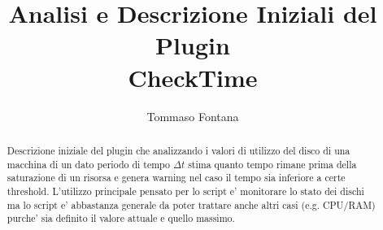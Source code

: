 \documentclass{article}
\title{Analisi e Descrizione Iniziali del Plugin \\ \textbf{CheckTime \version}}
\author{Tommaso Fontana}
\begin{document}
\maketitle

\begin{abstract}
Descrizione iniziale del plugin che analizzando i valori di utilizzo del disco di una macchina di un dato periodo di tempo \(\Delta t\) stima quanto tempo rimane prima della saturazione di un risorsa e genera warning nel caso il tempo sia inferiore a certe threshold. L'utilizzo principale pensato per lo script e' monitorare lo stato dei dischi ma lo script e' abbastanza generale da poter trattare anche altri casi (e.g. CPU/RAM) purche' sia definito il valore attuale e quello massimo.
\end{abstract}

\clearpage
\end{document}
